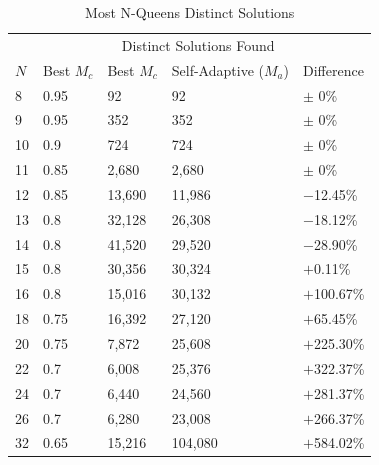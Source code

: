 \documentclass[conference]{IEEEtran}
\begin{document}
\begin{table}
\centering
\caption{Most N-Queens Distinct Solutions}
\begin{tabular}{|l|l|l|l|l|} \hline
&               &  \multicolumn{2}{c|}{Distinct Solutions Found}& \\ \cline{3-4}
$N$&  Best $M_{c}$&  Best $M_{c}$&    Self-Adaptive ($M_{a}$)&    Difference\\ \hline
8&  0.95&          92&              92&                         $\pm$ 0\% \\ \hline                        
9&  0.95&          352&             352&                        $\pm$ 0\% \\ \hline
10& 0.9&           724&             724&                        $\pm$ 0\% \\ \hline
11& 0.85&          2,680&           2,680&                      $\pm$ 0\% \\ \hline
12& 0.85&          13,690&          11,986&                     $-$12.45\% \\ \hline
13& 0.8&           32,128&          26,308&                     $-$18.12\% \\ \hline
14& 0.8&           41,520&          29,520&                     $-$28.90\% \\ \hline
15& 0.8&           30,356&          30,324&                     $+$0.11\% \\ \hline
16& 0.8&           15,016&          30,132&                     $+$100.67\% \\ \hline
18& 0.75&          16,392&          27,120&                     $+$65.45\% \\ \hline
20& 0.75&          7,872&           25,608&                     $+$225.30\% \\ \hline
22& 0.7&           6,008&           25,376&                     $+$322.37\% \\ \hline
24& 0.7&           6,440&           24,560&                     $+$281.37\% \\ \hline
26& 0.7&           6,280&           23,008&                     $+$266.37\% \\ \hline
32& 0.65&          15,216&          104,080&                    $+$584.02\% \\ \hline
\end{tabular}
\label{table:distinctsol}
\end{table}
\end{document}

